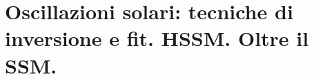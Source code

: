 \documentclass[../main.tex]{subfiles}
\begin{document}
{\let\clearpage\relax
\chapter{Oscillazioni solari: tecniche di inversione e fit. HSSM. Oltre il SSM.}}
\PartialToc

\begin{refsection}


\end{refsection}
\end{document}
